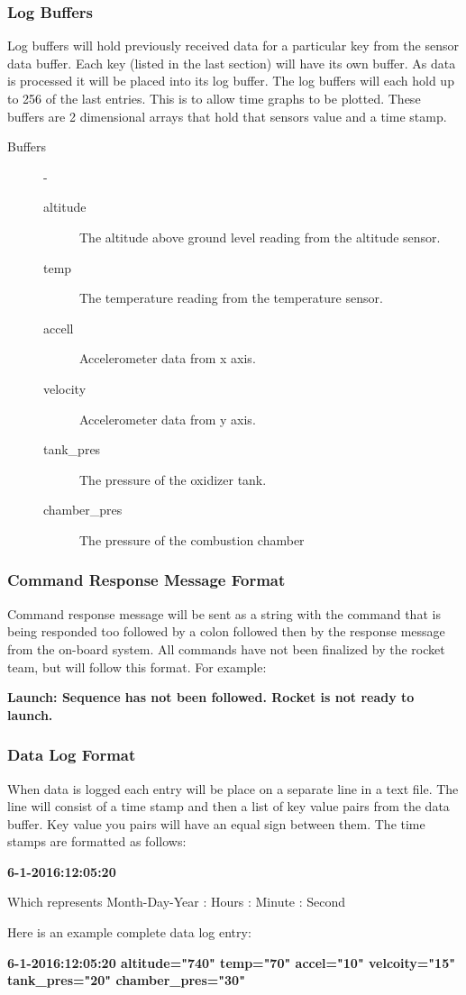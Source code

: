 \documentclass[10pt,draftclsnofoot,onecolumn,compsoc]{IEEEtran}
\begin{document}
\subsubsection{Log Buffers}
Log buffers will hold previously received data for a particular key from the sensor data buffer. Each key (listed in the last section) will have its own buffer. As data is processed it will be placed into its log buffer. The log buffers will each hold up to 256 of the last entries. This is to allow time graphs to be plotted. These buffers are 2 dimensional arrays that hold that sensors value and a time stamp.
\begin{description}
	\item[Buffers]  -
		\begin{description}
			\item[altitude] The altitude above ground level reading from the altitude sensor.
			\item[temp] The temperature reading from the temperature sensor.
			\item[accell] Accelerometer data from x axis.
			\item[velocity] Accelerometer data from y axis.
			\item[tank\_pres] The pressure of the oxidizer tank.
			\item[chamber\_pres] The pressure of the combustion chamber
		\end{description}
\end{description}

\subsubsection{Command Response Message Format}
Command response message will be sent as a string with the command that is being responded too followed by a colon followed then by the response message from the on-board system. All commands have not been finalized by the rocket team, but will follow this format.  For example: \par
{\bf Launch: Sequence has not been followed. Rocket is not ready to launch. } \par

\subsubsection{Data Log Format}
When data is logged each entry will be place on a separate line in a text file. The line will consist of a time stamp and then a list of key value pairs from the data buffer. Key value you pairs will have an equal sign between them. The time stamps are formatted as follows: \par 
{\bf 6-1-2016:12:05:20} \par
Which represents Month-Day-Year : Hours : Minute : Second \par
Here is an example complete data log entry: \par
{\bf 6-1-2016:12:05:20 altitude="740" temp="70" accel="10" velcoity="15" tank\_pres="20" chamber\_pres="30"}\par
\end{document}
